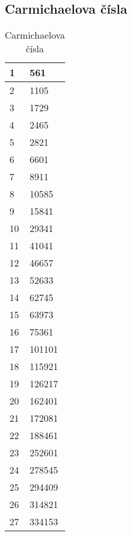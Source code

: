 \documentclass[11pt]{article}
\begin{document}
\subsection{Carmichaelova čísla}
\begin{table}[H]
\centering
\caption{Carmichaelova čísla}
\begin{tabular}{|l|l|}
\hline
     1	&561\\ \hline
     2	& 1105\\ \hline
     3	& 1729\\ \hline
     4	& 2465\\ \hline
     5	& 2821\\ \hline
     6	& 6601\\ \hline
     7	& 8911\\ \hline
     8	& 10585\\ \hline
     9	& 15841\\ \hline
    10	& 29341\\ \hline
    11	& 41041\\ \hline
    12	& 46657\\ \hline
    13	& 52633\\ \hline
    14	& 62745\\ \hline
    15	& 63973\\ \hline
    16	& 75361\\ \hline
    17	& 101101\\ \hline
    18	& 115921\\ \hline
    19	& 126217\\ \hline
    20	& 162401\\ \hline
    21	& 172081\\ \hline
    22	& 188461\\ \hline
    23	& 252601\\ \hline
    24	& 278545\\ \hline
    25	& 294409\\ \hline
    26	& 314821\\ \hline
    27	& 334153\\ \hline

\end{tabular}
\end{table}
\end{document}
